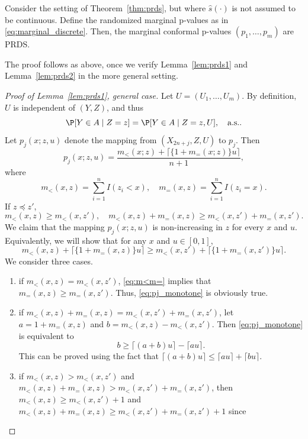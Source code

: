 \begin{prop}
Consider the setting of Theorem~\ref{thm:prds}, but where $\hat{s}(\cdot)$ is not assumed to be continuous. Define the randomized marginal p-values as in \eqref{eq:marginal_discrete}. Then, the marginal conformal p-values $(p_1,\dots,p_m)$ are PRDS.
\end{prop}

The proof follows as above, once we verify Lemma~\ref{lem:prds1} and Lemma~\ref{lem:prds2} in the more general setting.

\begin{proof}[Proof of Lemma~\ref{lem:prds1}, general case]
Let $U = (U_1, \ldots, U_m)$. By definition, $U$ is independent of $(Y, Z)$, and thus
\[\P[Y\in A\mid Z = z] = \P[Y\in A \mid Z = z, U], \quad \text{a.s.}.\]
Let $p_j(x; z, u)$ denote the mapping from $(X_{2n+j}, Z, U)$ to $p_j$. Then
\[p_j(x; z, u) = \frac{m_{<}(x; z) + \lceil\{1 + m_{=}(x; z)\}u\rceil}{n + 1},\]
where
\[m_{<}(x, z) = \sum_{i=1}^{n}I(z_i < x), \quad m_{=}(x, z) = \sum_{i=1}^{n}I(z_i = x).\]
If $z \preceq z'$,
\begin{equation}\label{eq:m<m=}
m_{<}(x, z)\ge m_{<}(x, z'), \quad m_{<}(x, z) + m_{=}(x, z)\ge m_{<}(x, z') + m_{=}(x, z').
\end{equation}
We claim that the mapping $p_j(x; z, u)$ is non-increasing in $z$ for every $x$ and $u$. Equivalently, we will show that for any $x$ and $u\in [0, 1]$,
\begin{equation}\label{eq:pj_monotone}
m_{<}(x, z) + \lceil \{1 + m_{=}(x, z)\} u\rceil\ge m_{<}(x, z') + \lceil \{1 + m_{=}(x, z')\}u\rceil.
\end{equation}
We consider three cases.
\begin{enumerate}[{Case} 1: ]
\item if $m_{<}(x, z) = m_{<}(x, z')$, \eqref{eq:m<m=} implies that $m_{=}(x, z)\ge m_{=}(x, z')$. Thus, \eqref{eq:pj_monotone} is obviously true.
\item if $m_{<}(x, z) + m_{=}(x, z) = m_{<}(x, z') + m_{=}(x, z')$, let $a = 1 + m_{=}(x, z)$ and $b = m_{<}(x, z) - m_{<}(x, z')$. Then \eqref{eq:pj_monotone} is equivalent to
\[b\ge \lceil (a + b)u\rceil - \lceil au\rceil.\]
This can be proved using the fact that $\lceil (a + b)u\rceil \le \lceil au\rceil + \lceil bu\rceil$.
\item if $m_{<}(x, z) > m_{<}(x, z')$ and $m_{<}(x, z) + m_{=}(x, z) > m_{<}(x, z') + m_{=}(x, z')$, then
$m_{<}(x, z) \ge m_{<}(x, z') + 1$ and $m_{<}(x, z) + m_{=}(x, z) \ge m_{<}(x, z') + m_{=}(x, z') + 1$ since

\end{enumerate}
\end{proof}
